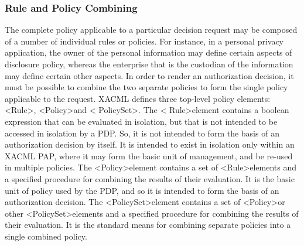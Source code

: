 \subsubsection{Rule and Policy Combining}
\hspace{5mm}The complete policy applicable to a particular decision request may be composed of a number of individual rules or policies. For instance, in a personal privacy application, the owner of the
personal information may define certain aspects of disclosure policy, whereas the enterprise that is
the custodian of the information may define certain other aspects. In order to render an
authorization decision, it must be possible to combine the two separate policies to form the
single policy applicable to the request.
XACML defines three top-level policy elements: \textless Rule\textgreater  , \textless Policy\textgreater   and \textless
PolicySet\textgreater  . The \textless
Rule\textgreater   element contains a boolean expression that can be evaluated in isolation, but that is not intended to be accessed in isolation by a PDP. So, it is not intended to form the basis of an authorization decision by itself. It is intended to exist in isolation only within an XACML PAP, where it may form the basic unit of management, and be re-used in multiple policies.
The \textless Policy\textgreater   element contains a set of \textless Rule\textgreater   elements and a specified procedure for
combining the results of their evaluation. It is the basic unit of policy used by the PDP, and so it is
intended to form the basis of an authorization decision.
The \textless PolicySet\textgreater   element contains a set of \textless Policy\textgreater   or other \textless PolicySet\textgreater   elements and a
specified procedure for combining the results of their evaluation. It is the standard means for
combining separate policies into a single combined policy.

